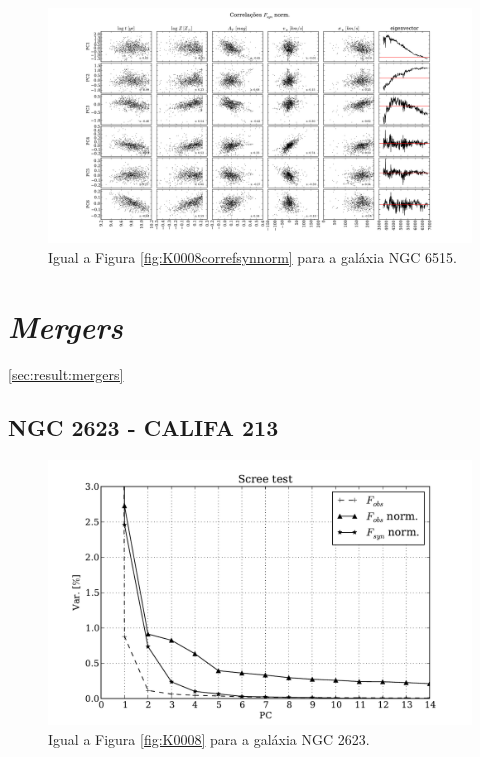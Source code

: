 \begin{figure}
    \includegraphics[width=1.3\textwidth, angle=-90]{figuras/K0864-correl-f_syn_norm-PCvsPhys.pdf}
	\caption[Correlações PCs vs. par\^ametros f\'isicos - $F_{syn}$ norm. - NGC 6515.]
	{Igual a Figura \ref{fig:K0008correfsynnorm} para a galáxia NGC 6515.}
    \label{fig:K0864correfsynnorm}
\end{figure}

\section{{\em Mergers}}
\ref{sec:result:mergers}

\subsection{NGC 2623 - CALIFA 213}

\begin{figure}
    \includegraphics[height=0.33\textheight]{figuras/K0213-screetest.pdf}
    \caption[Scree test comparativo entre 3 PCAs - NGC 2623.]
    {Igual a Figura \ref{fig:K0008} para a galáxia NGC 2623.}
    \label{fig:K0213scree}
\end{figure}

